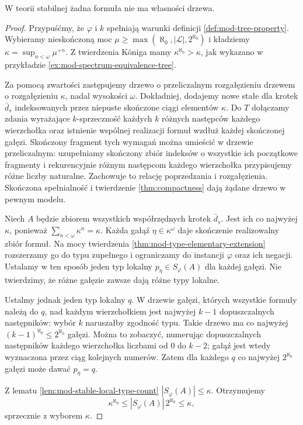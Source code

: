 \begin{twierdzenie}
\label{thm:mod-stable-no-tree-property}
W teorii stabilnej żadna formuła
nie ma własności drzewa.
\end{twierdzenie}
\begin{proof}
Przypuśćmy, że $\varphi$ i $k$ spełniają
warunki definicji \ref{def:mod-tree-property}.
Wybieramy nieskończoną moc
$\mu\geq\max(\aleph_0,|\mathcal L|,2^{\aleph_0})$
i kładziemy
$\kappa=\sup_{n<\omega}\mu^{+n}$.
Z twierdzenia Königa mamy
$\kappa^{\aleph_0}>\kappa$, jak wykazano
w przykładzie
\ref{ex:mod-spectrum-equivalence-tree}.

Za pomocą zwartości zastępujemy drzewo
o przeliczalnym rozgałęzieniu drzewem
o rozgałęzieniu $\kappa$, nadal wysokości
$\omega$. Dokładniej, dodajemy nowe stałe
dla krotek $\bar d_s$ indeksowanych przez
niepuste skończone ciągi elementów $\kappa$.
Do $T$ dołączamy zdania wyrażające
$k$-sprzeczność każdych $k$ różnych następców
każdego wierzchołka oraz istnienie wspólnej
realizacji formuł wzdłuż każdej skończonej
gałęzi. Skończony fragment tych wymagań
można umieścić w drzewie przeliczalnym:
uzupełniamy skończony zbiór indeksów
o wszystkie ich początkowe fragmenty
i rekurencyjnie różnym następcom każdego
wierzchołka przypisujemy różne liczby naturalne.
Zachowuje to relację poprzedzania i rozgałęzienia.
Skończona spełnialność i twierdzenie
\ref{thm:compactness} dają żądane drzewo
w pewnym modelu.

Niech $A$ będzie zbiorem wszystkich współrzędnych
krotek $\bar d_s$. Jest ich co najwyżej
$\kappa$, ponieważ
$\sum_{n<\omega}\kappa^n=\kappa$.
Każda gałąź $\eta\in\kappa^\omega$
daje skończenie realizowalny zbiór formuł.
Na mocy twierdzenia
\ref{thm:mod-type-elementary-extension}
rozszerzamy go do typu zupełnego i ograniczamy
do instancji $\varphi$ oraz ich negacji.
Ustalamy w ten sposób jeden typ lokalny
$p_\eta\in S_\varphi(A)$ dla każdej gałęzi.
Nie twierdzimy, że różne gałęzie zawsze
dają różne typy lokalne.

Ustalmy jednak jeden typ lokalny $q$.
W drzewie gałęzi, których wszystkie
formuły należą do $q$, nad każdym
wierzchołkiem jest najwyżej $k-1$
dopuszczalnych następników: wybór $k$
naruszałby zgodność typu.
Takie drzewo ma co najwyżej
$(k-1)^{\aleph_0}\leq2^{\aleph_0}$
gałęzi. Można to zobaczyć, numerując
dopuszczalnych następników każdego
wierzchołka liczbami od $0$ do $k-2$;
gałąź jest wtedy wyznaczona przez
ciąg kolejnych numerów.
Zatem dla każdego $q$ co najwyżej
$2^{\aleph_0}$ gałęzi może dawać $p_\eta=q$.

Z lematu \ref{lem:mod-stable-local-type-count}
$|S_\varphi(A)|\leq\kappa$.
Otrzymujemy
\[
\kappa^{\aleph_0}
\leq |S_\varphi(A)|\,2^{\aleph_0}
\leq\kappa,
\]
sprzecznie z wyborem $\kappa$.
\end{proof}

